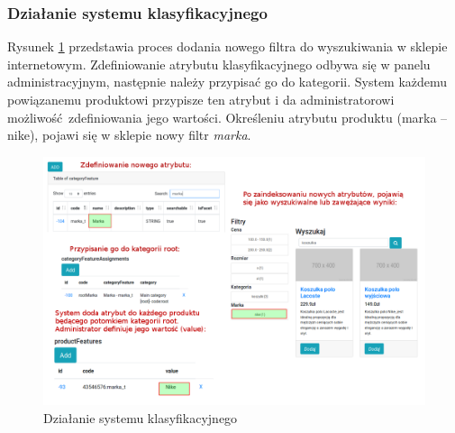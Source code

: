 \subsubsection{Działanie systemu klasyfikacyjnego}
Rysunek \ref{sysklasdzial} przedstawia proces dodania nowego filtra do wyszukiwania w sklepie internetowym. Zdefiniowanie atrybutu klasyfikacyjnego odbywa się w panelu administracyjnym, następnie należy przypisać go do kategorii. System każdemu powiązanemu produktowi przypisze ten atrybut i da administratorowi możliwość zdefiniowania jego wartości. Określeniu atrybutu produktu (marka -- nike), pojawi się w sklepie nowy filtr \textit{marka}.
\begin{figure}
	\begin{center}
		\includegraphics[scale=0.4]{sysklas-wyszfacet.png}
	\end{center}
	\caption{{\color{black}Działanie systemu klasyfikacyjnego}} \label{sysklasdzial}
\end{figure}

